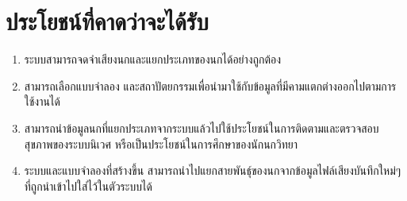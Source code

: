\section{ประโยชน์ที่คาดว่าจะได้รับ}
\begin{enumerate}
    \item ระบบสามารถจดจำเสียงนกและแยกประเภทของนกได้อย่างถูกต้อง
    \item สามารถเลือกแบบจำลอง และสถาปัตยกรรมเพื่อนำมาใช้กับข้อมูลที่มีคามแตกต่างออกไปตามการใช้งานได้
    \item สามารถนำข้อมูลนกที่แยกประเภทจากระบบแล้วไปใช้ประโยชน์ในการติดตามและตรวจสอบสุขภาพของระบบนิเวศ หรือเป็นประโยชน์ในการศึกษาของนักนกวิทยา
    \item ระบบและแบบจำลองที่สร้างขึ้น สามารถนำไปแยกสายพันธุ์ของนกจากข้อมูลไฟล์เสียงบันทึกใหม่ๆ ที่ถูกนำเข้าไปใส่ไว้ในตัวระบบได้
\end{enumerate}

